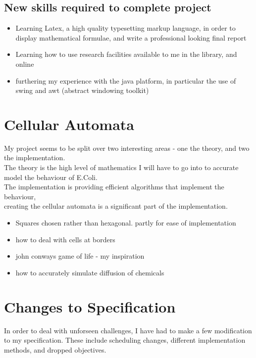 \documentclass[a4paper,onecolumn,oneside]{article}
\begin{document}
\subsection{New skills required to complete project}
\begin{itemize}
\item Learning Latex, a high quality typesetting markup language, in order to display mathematical formulae, and write a professional looking final report
\item Learning how to use research facilities available to me in the library, and online
\item furthering my experience with the java platform, in particular the use of swing and awt (abstract windowing toolkit)
\end{itemize}
\section{Cellular Automata}
My project seems to be split over two interesting areas - one the theory, and two the implementation. \\
The theory is the high level of mathematics I will have to go into to accurate model the behaviour of E.Coli. \\
The implementation is providing efficient algorithms that implement the behaviour, \\
creating the cellular automata is a significant part of the implementation. \\
\begin{itemize}
\item Squares chosen rather than hexagonal. partly for ease of implementation
\item how to deal with cells at borders
\item john conways game of life - my inspiration
\item how to accurately simulate diffusion of chemicals

\end{itemize}

\section{Changes to Specification}
In order to deal with unforseen challenges, I have had to make a few modification to my specification. These include scheduling changes, different implementation methods, and dropped objectives.
\end{document}
